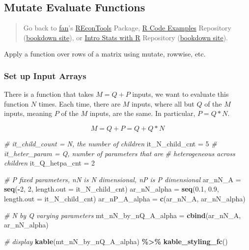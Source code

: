 \documentclass[
]{book}
\newenvironment{Shaded}{\begin{snugshade}}{\end{snugshade}}
\newcommand{\CommentTok}[1]{\textcolor[rgb]{0.56,0.35,0.01}{\textit{#1}}}
\newcommand{\DataTypeTok}[1]{\textcolor[rgb]{0.13,0.29,0.53}{#1}}
\newcommand{\DecValTok}[1]{\textcolor[rgb]{0.00,0.00,0.81}{#1}}
\newcommand{\FloatTok}[1]{\textcolor[rgb]{0.00,0.00,0.81}{#1}}
\newcommand{\KeywordTok}[1]{\textcolor[rgb]{0.13,0.29,0.53}{\textbf{#1}}}
\newcommand{\NormalTok}[1]{#1}
\newcommand{\OperatorTok}[1]{\textcolor[rgb]{0.81,0.36,0.00}{\textbf{#1}}}
\newcommand{\StringTok}[1]{\textcolor[rgb]{0.31,0.60,0.02}{#1}}
\begin{document}
\hypertarget{mutate-evaluate-functions}{%
\subsection{Mutate Evaluate Functions}\label{mutate-evaluate-functions}}

\begin{quote}
Go back to \href{http://fanwangecon.github.io/}{fan}'s \href{https://fanwangecon.github.io/REconTools/}{REconTools} Package, \href{https://fanwangecon.github.io/R4Econ/}{R Code Examples} Repository (\href{https://fanwangecon.github.io/R4Econ/bookdown}{bookdown site}), or \href{https://fanwangecon.github.io/Stat4Econ/}{Intro Stats with R} Repository (\href{https://fanwangecon.github.io/Stat4Econ/bookdown}{bookdown site}).
\end{quote}

Apply a function over rows of a matrix using mutate, rowwise, etc.

\hypertarget{set-up-input-arrays-3}{%
\subsubsection{Set up Input Arrays}\label{set-up-input-arrays-3}}

There is a function that takes \(M=Q+P\) inputs, we want to evaluate this function \(N\) times. Each time, there are \(M\) inputs, where all but \(Q\) of the \(M\) inputs, meaning \(P\) of the \(M\) inputs, are the same. In particular, \(P=Q*N\).

\[M = Q+P = Q + Q*N\]

\begin{Shaded}
\begin{Highlighting}[]
\CommentTok{\# it\_child\_count = N, the number of children}
\NormalTok{it\_N\_child\_cnt =}\StringTok{ }\DecValTok{5}
\CommentTok{\# it\_heter\_param = Q, number of parameters that are}
\CommentTok{\# heterogeneous across children}
\NormalTok{it\_Q\_hetpa\_cnt =}\StringTok{ }\DecValTok{2}

\CommentTok{\# P fixed parameters, nN is N dimensional, nP is P dimensional}
\NormalTok{ar\_nN\_A =}\StringTok{ }\KeywordTok{seq}\NormalTok{(}\OperatorTok{{-}}\DecValTok{2}\NormalTok{, }\DecValTok{2}\NormalTok{, }\DataTypeTok{length.out =}\NormalTok{ it\_N\_child\_cnt)}
\NormalTok{ar\_nN\_alpha =}\StringTok{ }\KeywordTok{seq}\NormalTok{(}\FloatTok{0.1}\NormalTok{, }\FloatTok{0.9}\NormalTok{, }\DataTypeTok{length.out =}\NormalTok{ it\_N\_child\_cnt)}
\NormalTok{ar\_nP\_A\_alpha =}\StringTok{ }\KeywordTok{c}\NormalTok{(ar\_nN\_A, ar\_nN\_alpha)}

\CommentTok{\# N by Q varying parameters}
\NormalTok{mt\_nN\_by\_nQ\_A\_alpha =}\StringTok{ }\KeywordTok{cbind}\NormalTok{(ar\_nN\_A, ar\_nN\_alpha)}

\CommentTok{\# display}
\KeywordTok{kable}\NormalTok{(mt\_nN\_by\_nQ\_A\_alpha) }\OperatorTok{\%\textgreater{}\%}
\StringTok{  }\KeywordTok{kable\_styling\_fc}\NormalTok{()}
\end{Highlighting}
\end{Shaded}
\end{document}
